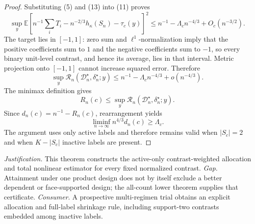 \documentclass{article}
\begin{document}
\begin{proof}
Substituting (5) and (13) into (11) proves
\[
\sup_y\mathbb E\left[
n^{-1}\sum_iT_i-n^{-2/3}h_\kappa(S_n)-\tau_c(y)
\right]^2
\le n^{-1}-\Lambda_cn^{-4/3}+O_c(n^{-3/2}).
\]
The target lies in \([-1,1]\): zero sum and \(\ell^1\)-normalization imply that the positive coefficients sum to \(1\) and the negative coefficients sum to \(-1\), so every binary unit-level contrast, and hence its average, lies in that interval.  Metric projection onto \([-1,1]\) cannot increase squared error.  Therefore
\[
\sup_y\mathcal R_n(\mathcal D_n^\star,\delta_n^\star;y)
\le n^{-1}-\Lambda_cn^{-4/3}+o(n^{-4/3}).
\]
The minimax definition gives
\[
R_n(c)\le
\sup_y\mathcal R_n(\mathcal D_n^\star,\delta_n^\star;y).
\]
Since \(d_n(c)=n^{-1}-R_n(c)\), rearrangement yields
\[
\liminf_{n\to\infty}n^{4/3}d_n(c)\ge\Lambda_c.
\]
The argument uses only active labels and therefore remains valid when \(|S_c|=2\) and when \(K-|S_c|\) inactive labels are present.
\end{proof}
\par\smallskip\noindent \textit{Justification.} This theorem constructs the active-only contrast-weighted allocation and total nonlinear estimator for every fixed normalized contrast. \textit{Gap.} Attainment under one product design does not by itself exclude a better dependent or face-supported design; the all-count lower theorem supplies that certificate. \textit{Consumer.} A prospective multi-regimen trial obtains an explicit allocation and full-label shrinkage rule, including support-two contrasts embedded among inactive labels.
\end{document}
